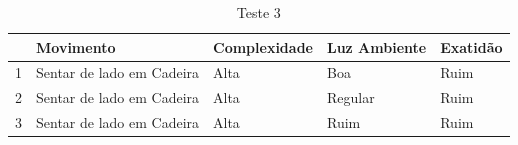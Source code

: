 \begin{table}[H]
\centering
\caption{Teste 3}
\label{tab:teste3}
\begin{tabular}{@{}|c|c|l|l|l|@{}}
\toprule
\multicolumn{1}{|l|}{ } & \multicolumn{1}{l|}{\textbf{Movimento}} & \textbf{Complexidade} & \textbf{Luz Ambiente} & \textbf{Exatidão} \\ \midrule
1                                 & Sentar de lado em Cadeira                     & Alta                 & Boa                   & Ruim               \\ \midrule
2                                 & Sentar de lado em Cadeira                     & Alta                 & Regular               & Ruim           \\ \midrule
3                                 & Sentar de lado em Cadeira                     & Alta                 & Ruim                  & Ruim              \\ \bottomrule
\end{tabular}
\end{table}

